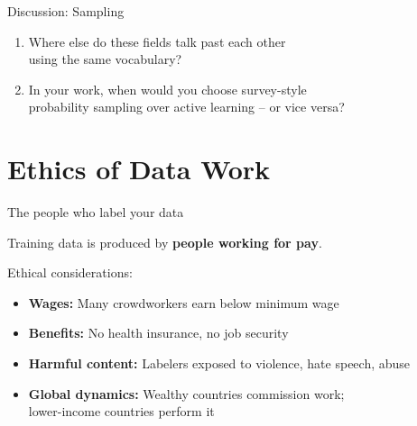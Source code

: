\documentclass[aspectratio=169,11pt]{beamer}
\begin{document}
\begin{frame}{Discussion: Sampling}

\begin{enumerate}
  \item Where else do these fields talk past each other\\
        using the same vocabulary?

  \vspace{1em}

  \item In your work, when would you choose survey-style\\
        probability sampling over active learning -- or vice versa?
\end{enumerate}
\end{frame}


\section{Ethics of Data Work}

\begin{frame}{The people who label your data}

Training data is produced by \textbf{people working for pay}.

\vspace{1em}

Ethical considerations:
\begin{itemize}
  \item \textbf{Wages:} Many crowdworkers earn below minimum wage
  \item \textbf{Benefits:} No health insurance, no job security
  \item \textbf{Harmful content:} Labelers exposed to violence, hate speech, abuse
  \item \textbf{Global dynamics:} Wealthy countries commission work;\\
        lower-income countries perform it
\end{itemize}
\end{frame}
\end{document}
